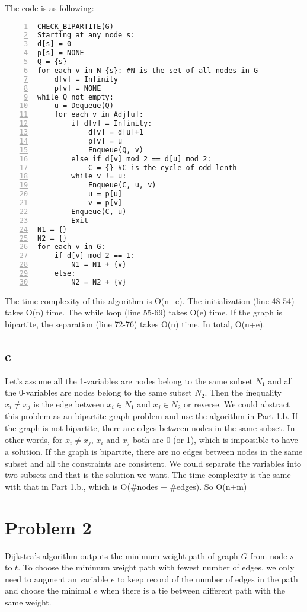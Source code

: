 \documentclass[twoside,11pt]{homework}
\begin{document}
The code is as following:
\begin{colorboxed}
\begin{lstlisting}[language={[ANSI]C},numbers=left,numberstyle=\tiny, frame=single, title=Check\_Bipartite, breaklines=true,
   rulesepcolor=\color{red!20!green!20!blue!20},
   keywordstyle=\color{blue!70!black},
   commentstyle=\color{blue!90!},
   basicstyle=\ttfamily]
CHECK_BIPARTITE(G)
Starting at any node s: 
d[s] = 0
p[s] = NONE
Q = {s}
for each v in N-{s}: #N is the set of all nodes in G
    d[v] = Infinity
    p[v] = NONE
while Q not empty:
    u = Dequeue(Q)
    for each v in Adj[u]:
        if d[v] = Infinity:
            d[v] = d[u]+1
            p[v] = u
            Enqueue(Q, v)
        else if d[v] mod 2 == d[u] mod 2:
            C = {} #C is the cycle of odd lenth
	    while v != u:
	        Enqueue(C, u, v)
	        u = p[u]
	        v = p[v]
	    Enqueue(C, u)
	    Exit
N1 = {}
N2 = {}	    
for each v in G:
    if d[v] mod 2 == 1:
        N1 = N1 + {v}
    else:
        N2 = N2 + {v}
\end{lstlisting}
\end{colorboxed}   
The time complexity of this algorithm is O(n+e). 
The initialization (line 48-54) takes O(n) time.
The while loop (line 55-69) takes O(e) time.
If the graph is bipartite, the separation (line 72-76) takes O(n) time.
In total, O(n+e). 

\subsection*{c}
Let's assume all the 1-variables are nodes belong to the same subset $N_1$ and all the 0-variables are nodes belong to the same subset $N_2$.
Then the inequality $x_i \neq x_j$ is the edge between $x_i \in N_1$ and $x_j \in N_2$ or reverse.
We could abstract this problem as an bipartite graph problem and use the algorithm in Part 1.b.
If the graph is not bipartite, there are edges between nodes in the same subset.
In other words, for $x_i \neq x_j$, $x_i$ and $x_j$ both are 0 (or 1), which is impossible to have a solution.
If the graph is bipartite, there are no edges between nodes in the same subset and all the constraints are consistent.
We could separate the variables into two subsets and that is the solution we want.
The time complexity is the same with that in Part 1.b., which is O(#nodes + #edges).
So O(n+m)


\section*{Problem 2}
Dijkstra's algorithm outputs the minimum weight path of graph $G$ from node $s$ to $t$.
To choose the minimum weight path with fewest number of edges, we only need to augment an variable $e$ to keep record of the number of edges in the path and choose the minimal $e$ when there is a tie between different path with the same weight.
\end{document}
